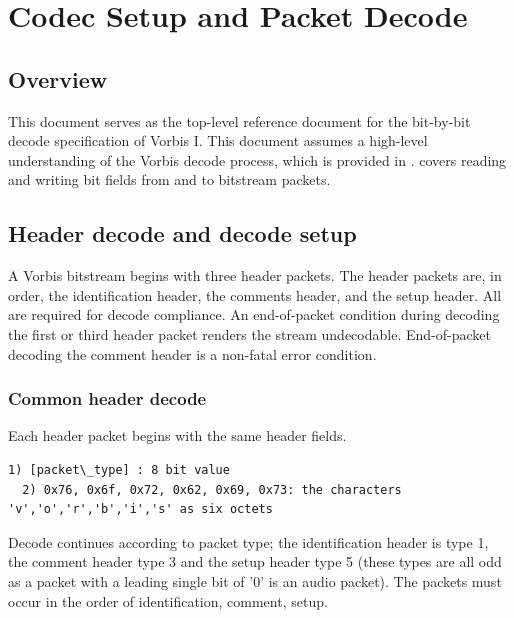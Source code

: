 
\section{Codec Setup and Packet Decode} \label{vorbis:spec:codec}

\subsection{Overview}

This document serves as the top-level reference document for the
bit-by-bit decode specification of Vorbis I.  This document assumes a
high-level understanding of the Vorbis decode process, which is
provided in .   covers reading and writing bit fields from
and to bitstream packets.



\subsection{Header decode and decode setup}

A Vorbis bitstream begins with three header packets. The header
packets are, in order, the identification header, the comments header,
and the setup header. All are required for decode compliance.  An
end-of-packet condition during decoding the first or third header
packet renders the stream undecodable.  End-of-packet decoding the
comment header is a non-fatal error condition.

\subsubsection{Common header decode}

Each header packet begins with the same header fields.


\begin{Verbatim}[commandchars=\\\{\}]
  1) [packet\_type] : 8 bit value
  2) 0x76, 0x6f, 0x72, 0x62, 0x69, 0x73: the characters 'v','o','r','b','i','s' as six octets
\end{Verbatim}

Decode continues according to packet type; the identification header
is type 1, the comment header type 3 and the setup header type 5
(these types are all odd as a packet with a leading single bit of '0'
is an audio packet).  The packets must occur in the order of
identification, comment, setup.



